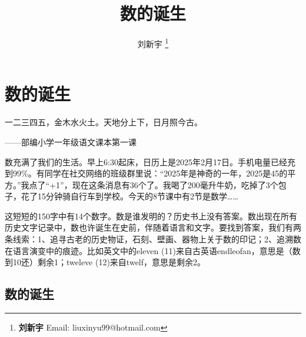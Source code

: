 \documentclass[b5paper]{ctexart}
\begin{document}
\title{数的诞生}

\author{刘新宇
\thanks{{\bfseries 刘新宇} \newline
  Email: liuxinyu99@hotmail.com \newline}
  }

\maketitle
\fi


\ifx\wholebook\relax
\chapter{数的诞生}
\fi

\epigraph{一二三四五，金木水火土。天地分上下，日月照今古。}{——部编小学一年级语文课本第一课}

数充满了我们的生活。早上6:30起床，日历上是2025年2月17日。手机电量已经充到99\%。有同学在社交网络的班级群里说：“2025年是神奇的一年，2025是45的平方。”我点了“+1”，现在这条消息有36个\heartsuit{}了。我喝了200毫升牛奶，吃掉了3个包子，花了15分钟骑自行车到学校。今天的8节课中有2节是数学……

这短短的150字中有14个数字。数是谁发明的？历史书上没有答案。数出现在所有历史文字记录中，数也许诞生在史前，伴随着语言和文字。要找到答案，我们有两条线索：1、追寻古老的历史物证，石刻、壁画、器物上关于数的印记；2、追溯数在语言演变中的痕迹。比如英文中的eleven (11)来自古英语endleofan，意思是（数到10还）剩余1；tweleve (12)来自twelf，意思是剩余2。

\section{数的诞生}
\end{document}
